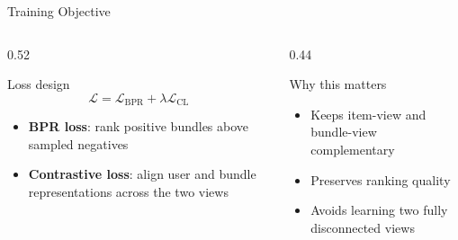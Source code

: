 \documentclass[aspectratio=169]{beamer}
\begin{document}
\begin{frame}{Training Objective}
  \begin{columns}[T]
    \begin{column}{0.52\textwidth}
      \begin{block}{Loss design}
        \[
          \mathcal{L} = \mathcal{L}_{\mathrm{BPR}} + \lambda \mathcal{L}_{\mathrm{CL}}
        \]
        \begin{itemize}
          \item \textbf{BPR loss}: rank positive bundles above sampled negatives
          \item \textbf{Contrastive loss}: align user and bundle representations across the two views
        \end{itemize}
      \end{block}
    \end{column}
    \begin{column}{0.44\textwidth}
      \begin{block}{Why this matters}
        \begin{itemize}
          \item Keeps item-view and bundle-view complementary
          \item Preserves ranking quality
          \item Avoids learning two fully disconnected views
        \end{itemize}
      \end{block}
    \end{column}
  \end{columns}
\end{frame}
\end{document}
